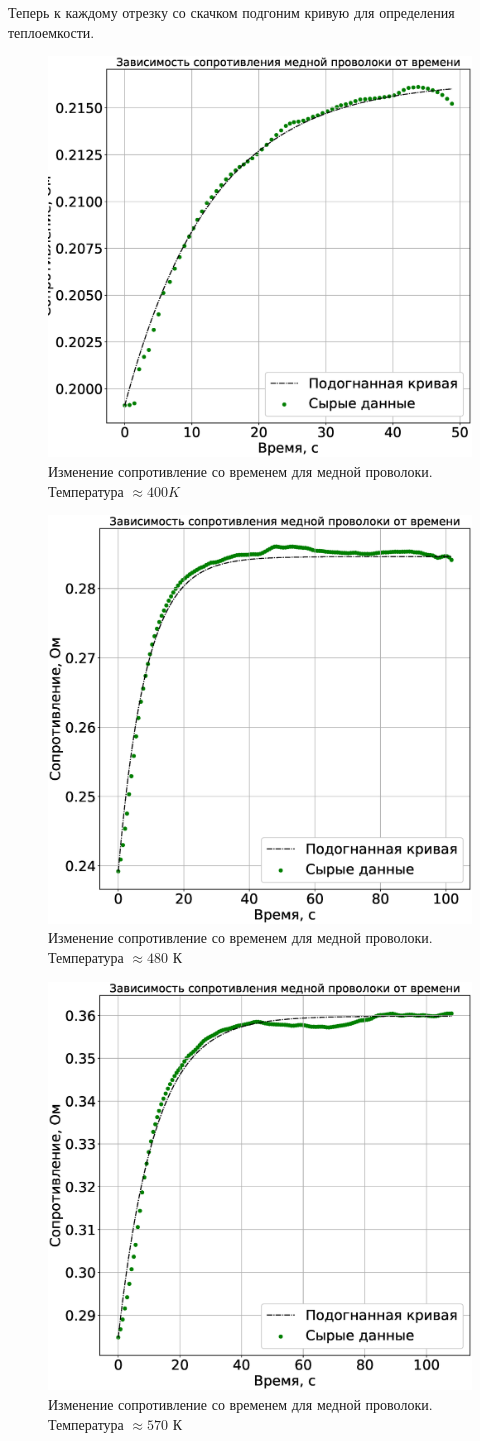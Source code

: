 \documentclass[a4paper,14pt]{extarticle}
\begin{document}
			Теперь к каждому отрезку со скачком подгоним кривую для определения теплоемкости.
			\begin{figure}[h!]
				\centering
				\includegraphics[width=.60\linewidth]{Lab3_9.eps}
				\caption{Изменение сопротивление со временем для медной проволоки. Температура $\approx 400K$}
				\label{fig9}
			\end{figure}
			
			\begin{figure}[h!]
				\centering
				\includegraphics[width=.60\linewidth]{Lab3_10.eps}
				\caption{Изменение сопротивление со временем для медной проволоки. Температура $\approx 480$ К}
				\label{fig9}
			\end{figure}
			
			\begin{figure}[h!]
				\centering
				\includegraphics[width=.60\linewidth]{Lab3_11.eps}
				\caption{Изменение сопротивление со временем для медной проволоки. Температура $\approx 570$ К}
				\label{fig9}
			\end{figure}
			
\end{document}
